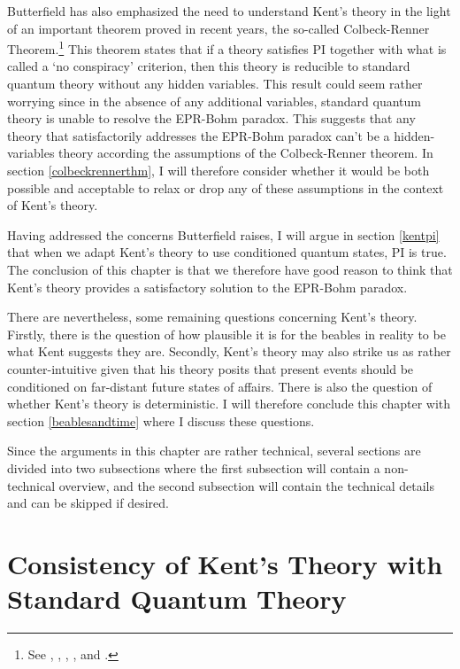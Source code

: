 \documentclass[12pt]{report}
\providecommand{\DIFadd}[1]{{\protect\color{blue}\uwave{#1}}} %
\providecommand{\DIFaddbegin}{} %
\providecommand{\DIFaddend}{} %
\begin{document}
Butterfield has also emphasized the need to understand Kent's theory in the light of an important theorem proved in recent years, the so-called Colbeck-Renner Theorem.\footnote{See \cite{LeegwaterGijs2016Aitf}, \cite{ColbeckRoger2011Neoq}, \cite{ColbeckRoger2012Tcoq}, \cite{LandsmanK2015OtCt}, and \cite{Landsman}.} This theorem states that if a theory satisfies PI together with what is called a `no conspiracy' criterion, then this theory is reducible to standard quantum theory without any hidden variables. This result could seem rather worrying since in the absence of any additional variables, standard quantum theory is unable to resolve the EPR-Bohm paradox. This  suggests that any theory that satisfactorily addresses the  EPR-Bohm paradox can't be a hidden-variables theory according \DIFaddbegin \DIFadd{to }\DIFaddend the assumptions of the Colbeck-Renner theorem. In section \ref{colbeckrennerthm}, I will therefore consider whether it would be both possible and acceptable to relax or drop any of these assumptions in the context of Kent's theory.

Having addressed the concerns Butterfield raises,  I will argue in section \ref{kentpi} that when we adapt Kent's theory to use conditioned quantum states, PI is true. The conclusion of this chapter is that we therefore have good reason to think that Kent's theory provides a satisfactory solution to the EPR-Bohm paradox. 

There are nevertheless, some remaining questions concerning Kent's theory. Firstly, there is the question of how plausible it is for the  beables in reality to be what Kent suggests they are. Secondly, Kent's theory may also strike us as rather counter-intuitive given that his theory posits that present events should be conditioned on far-distant future states of affairs. There is also the question of whether Kent's theory is deterministic. I will therefore conclude this chapter with section \ref{beablesandtime} where I discuss these questions.

Since the arguments in this chapter are rather technical, several sections are divided into two subsections where the first subsection will contain a non-technical overview, and the second subsection will contain the technical details and can be skipped if desired.  

\section{Consistency of Kent's Theory with Standard Quantum Theory\label{kentinterpretationconsistency}}
\end{document}
